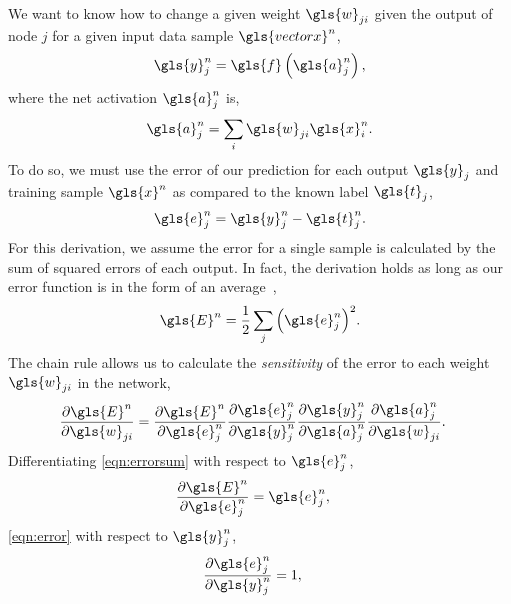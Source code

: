 \documentclass[thesis]{subfiles}
\begin{document}
We want to know how to change a given weight $\gls{w}_{ji}$ given the output of node $j$ for a given input data sample $\gls{vectorx}^n$, 
\begin{equation}
	\gls{y}^n_j = \gls{f}\left( \gls{a}^n_j \right),
	\label{eqn:output}
\end{equation}
where the net activation $\gls{a}^n_j$ is,
\begin{equation}
	\gls{a}^n_j = \sum_i \gls{w}_{ji} \gls{x}^n_{i}.
	\label{eqn:weightsum}
\end{equation}
To do so, we must use the error of our prediction for each output $\gls{y}_j$ and training sample $\gls{x}^n$ as compared to the known label $\gls{t}_j$,
\begin{equation}
    \gls{e}^n_j = \gls{y}^n_j - \gls{t}^n_j.
    \label{eqn:error}
\end{equation}
%
For this derivation, we assume the error for a single sample is calculated by the sum of squared errors of each output. In fact, the derivation holds as long as our error function is in the form of an average~\citep{Bishop1995},
\begin{equation}
    \gls{E}^n = \frac{1}{2} \sum_j {\left(\gls{e}^n_j\right)}^2.
    \label{eqn:errorsum}
\end{equation}
The chain rule allows us to calculate the \emph{sensitivity} of the error to each weight $\gls{w}_{ji}$ in the network,
\begin{equation}
\begin{aligned}
    \frac{\partial \gls{E}^n}{\partial \gls{w}_{ji}} &= \frac{\partial \gls{E}^n}{\partial \gls{e}^n_j}\frac{\partial \gls{e}^n_j}{\partial \gls{y}^n_j} \frac{\partial \gls{y}^n_j}{\partial \gls{a}^n_j} \frac{\partial \gls{a}^n_j}{\partial \gls{w}_{ji}}.
\end{aligned}
\end{equation}
%
Differentiating \cref{eqn:errorsum} with respect to $\gls{e}^n_j$,
\begin{equation}
\begin{aligned}
    \frac{\partial \gls{E}^n}{\partial \gls{e}^n_j} &= \gls{e}^n_j,
\end{aligned}
\end{equation}
%
\cref{eqn:error} with respect to $\gls{y}^n_j$,
\begin{equation}
\begin{aligned}
    \frac{\partial \gls{e}^n_j}{\partial \gls{y}^n_j} &= 1,
\end{aligned}
\end{equation}
\end{document}
